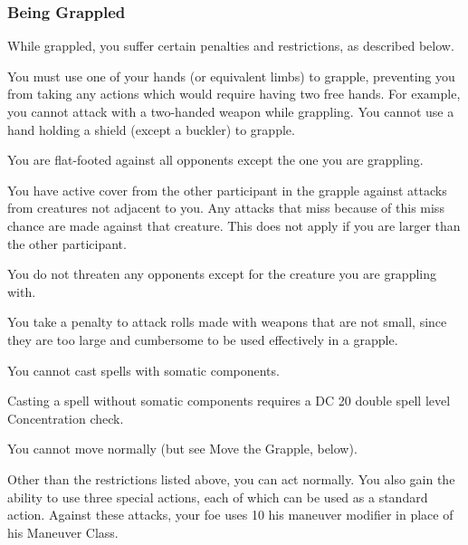 \subsubsection{Being Grappled}
While grappled, you suffer certain penalties and restrictions, as described below.
\begin{itemize*}
    \item You must use one of your hands (or equivalent limbs) to grapple, preventing you from taking any actions which would require having two free hands. For example, you cannot attack with a two-handed weapon while grappling. You cannot use a hand holding a shield (except a buckler) to grapple.
    \item You are flat-footed against all opponents except the one you are grappling.
    \item You have active cover from the other participant in the grapple against attacks from creatures not adjacent to you. Any attacks that miss because of this miss chance are made against that creature. This does not apply if you are larger than the other participant.
    \item You do not threaten any opponents except for the creature you are grappling with.
    \item You take a  penalty to attack rolls made with weapons that are not small, since they are too large and cumbersome to be used effectively in a grapple.
    \item You cannot cast spells with somatic components.
    \item Casting a spell without somatic components requires a DC 20 \add double spell level Concentration check.
    \item You cannot move normally (but see Move the Grapple, below).
\end{itemize*}

Other than the restrictions listed above, you can act normally. You also gain the ability to use three special actions, each of which can be used as a standard action. Against these attacks, your foe uses 10 \add his maneuver modifier in place of his Maneuver Class.

